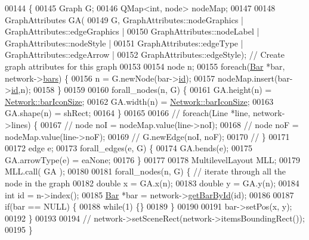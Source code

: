 \begin{DoxyCode}
00144 \{
00145   Graph G;
00146   QMap<int, node> nodeMap;
00147 
00148   GraphAttributes GA(
00149     G, GraphAttributes::nodeGraphics | GraphAttributes::edgeGraphics |
00150     GraphAttributes::nodeLabel | GraphAttributes::nodeStyle |
00151     GraphAttributes::edgeType | GraphAttributes::edgeArrow |
00152     GraphAttributes::edgeStyle);  \textcolor{comment}{// Create graph attributes for this graph}
00153 
00154   node n;
00155   \textcolor{keywordflow}{foreach}(\hyperlink{class_bar}{Bar} *bar, network->\hyperlink{class_network_a7fe628f7de34a96235cbd3f2cee4aff2}{bars}) \{
00156     n = G.newNode(bar->\hyperlink{class_bar_a9dc5c6a6d44fe412ae34ef8a881b8dce}{id});
00157     nodeMap.insert(bar->\hyperlink{class_bar_a9dc5c6a6d44fe412ae34ef8a881b8dce}{id},n);
00158   \}
00159 
00160   forall\_nodes(n, G) \{
00161     GA.height(n) = \hyperlink{group___graphics_gaa334bbc93b3fde219840e95e23198b53}{Network::barIconSize};
00162     GA.width(n) = \hyperlink{group___graphics_gaa334bbc93b3fde219840e95e23198b53}{Network::barIconSize};
00163     GA.shape(n) = shRect;
00164   \}
00165 
00166 \textcolor{comment}{//  foreach(Line *line, network->lines) \{}
00167 \textcolor{comment}{//    node noI = nodeMap.value(line->noI);}
00168 \textcolor{comment}{//    node noF = nodeMap.value(line->noF);}
00169 \textcolor{comment}{//    G.newEdge(noI, noF);}
00170 \textcolor{comment}{//  \}}
00171 
00172   edge e;
00173   forall\_edges(e, G) \{
00174     GA.bends(e);
00175     GA.arrowType(e) = eaNone;
00176   \}
00177 
00178   MultilevelLayout MLL;
00179   MLL.call( GA );
00180 
00181   forall\_nodes(n, G) \{  \textcolor{comment}{// iterate through all the node in the graph}
00182     \textcolor{keywordtype}{double} x = GA.x(n);
00183     \textcolor{keywordtype}{double} y = GA.y(n);
00184     \textcolor{keywordtype}{int} \textcolor{keywordtype}{id} = n->index();
00185     \hyperlink{class_bar}{Bar} *bar = network->\hyperlink{group___graphics_ga9c5806f5a0d236bb6d8abbdce62d9675}{getBarById}(\textcolor{keywordtype}{id});
00186 
00187     \textcolor{keywordflow}{if}(bar == NULL) \{
00188       \textcolor{keywordflow}{while}(1) \{\}
00189     \}
00190 
00191     bar->setPos(x, y);
00192   \}
00193 
00194 \textcolor{comment}{//  network->setSceneRect(network->itemsBoundingRect());}
00195 \}
\end{DoxyCode}
